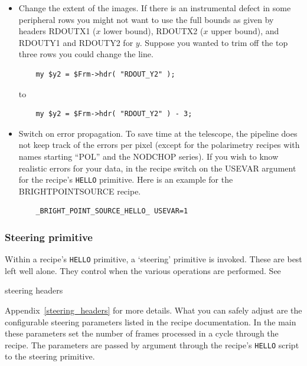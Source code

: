 \documentclass[twoside,11pt]{article}
\newcommand{\htmlref}[2]{#1}
\newenvironment{latexonly}{}{}
\newcommand{\xlabel}[1]{}
\renewcommand{\_}{\texttt{\symbol{95}}}
\begin{document}
\begin{itemize}

\item Change the extent of the images.  If there is an instrumental defect
in some peripheral rows you might not want to use the full bounds
as given by headers RDOUT\_X1 ($x$ lower bound), RDOUT\_X2
($x$ upper bound), and RDOUT\_Y1 and RDOUT\_Y2 for $y$.  Suppose you
wanted to trim off the top three rows you could change the line.

\begin{verbatim}
    my $y2 = $Frm->hdr( "RDOUT_Y2" );
\end{verbatim}
to
\begin{verbatim}
    my $y2 = $Frm->hdr( "RDOUT_Y2" ) - 3;
\end{verbatim}

\item 
\xlabel{switch_on_data_variance}\label{switch_on_data_variance}
Switch on error propagation.  To save time at the telescope, the
pipeline does not keep track of the errors per pixel (except for the
polarimetry recipes with names starting ``POL'' and the NOD\_CHOP
series).  If you wish to know realistic errors for your data, in the
recipe switch on the USEVAR argument for the recipe's {\tt\_HELLO}
primitive.  Here is an example for the
\htmlref{BRIGHT\_POINT\_SOURCE}{BRIGHT\_POINT\_SOURCE} recipe.

\begin{verbatim}
    _BRIGHT_POINT_SOURCE_HELLO_ USEVAR=1
\end{verbatim}

\end{itemize}

\subsubsection{\xlabel{steering_primitive}Steering
primitive\label{steering_primitive}}

Within a recipe's {\tt\_HELLO} primitive, a `steering' primitive is invoked.
These are best left well alone.  They control when the various
operations are performed.  See
\begin{htmlonly}
\htmlref{steering headers}{steering_headers}
\end{htmlonly}
\begin{latexonly}
Appendix~\ref{steering_headers}
\end{latexonly}
for more details.  What you can safely adjust are the
configurable steering parameters listed in the recipe documentation.
In the main these parameters set the number of frames processed in a
cycle through the recipe.  The parameters are passed by argument
through the recipe's {\tt\_HELLO} script to the steering primitive.
\end{document}
